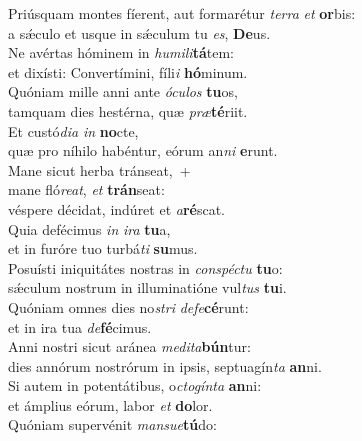 \evenverse Priúsquam montes fíerent, aut formarétur \textit{ter}\textit{ra} \textit{et} \textbf{or}bis:~\*\\
\evenverse a sǽculo et usque in sǽculum tu \textit{es}, \textbf{De}us.\\
\oddverse Ne avértas hóminem in \textit{hu}\textit{mi}\textit{li}\textbf{tá}tem:~\*\\
\oddverse et dixísti: Convertímini, fíli\textit{i} \textbf{hó}minum.\\
\evenverse Quóniam mille anni ante \textit{ó}\textit{cu}\textit{los} \textbf{tu}os,~\*\\
\evenverse tamquam dies hestérna, quæ \textit{præ}\textbf{té}riit.\\
\oddverse Et custó\textit{di}\textit{a} \textit{in} \textbf{no}cte,~\*\\
\oddverse quæ pro níhilo habéntur, eórum an\textit{ni} \textbf{e}runt.\\
\evenverse Mane sicut herba tránseat,~+\\
\evenverse  mane fló\textit{re}\textit{at}, \textit{et} \textbf{trán}seat:~\*\\
\evenverse véspere décidat, indúret et \textit{a}\textbf{ré}scat.\\
\oddverse Quia defécimus \textit{in} \textit{i}\textit{ra} \textbf{tu}a,~\*\\
\oddverse et in furóre tuo turbá\textit{ti} \textbf{su}mus.\\
\evenverse Posuísti iniquitátes nostras in \textit{con}\textit{spé}\textit{ctu} \textbf{tu}o:~\*\\
\evenverse sǽculum nostrum in illuminatióne vul\textit{tus} \textbf{tu}i.\\
\oddverse Quóniam omnes dies no\textit{stri} \textit{de}\textit{fe}\textbf{cé}runt:~\*\\
\oddverse et in ira tua \textit{de}\textbf{fé}cimus.\\
\evenverse Anni nostri sicut aránea \textit{me}\textit{di}\textit{ta}\textbf{bún}tur:~\*\\
\evenverse dies annórum nostrórum in ipsis, septuagín\textit{ta} \textbf{an}ni.\\
\oddverse Si autem in potentátibus, o\textit{cto}\textit{gín}\textit{ta} \textbf{an}ni:~\*\\
\oddverse et ámplius eórum, labor \textit{et} \textbf{do}lor.\\
\evenverse Quóniam supervénit \textit{man}\textit{su}\textit{e}\textbf{tú}do:~\*\\
